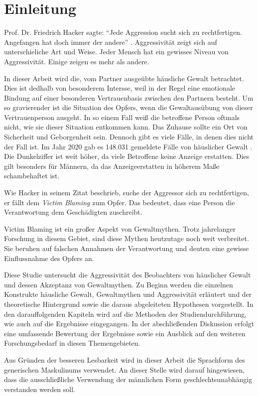 \chapter{Einleitung}   \label{ch_1}
Prof. Dr. Friedrich Hacker sagte: \enquote{Jede Aggression sucht sich zu rechtfertigen. Angefangen hat doch immer der andere} \parencite{Friedrich_Hacker}. Aggressivität zeigt sich auf unterschieliche Art und Weise. Jeder Mensch hat ein gewisses Niveau von Aggressivität. Einige zeigen es mehr als andere. 


In dieser Arbeit wird die, vom Partner ausgeübte häusliche Gewalt betrachtet. Dies ist dedhalb von besonderem Intersse, weil in der Regel eine emotionale Bindung auf einer besonderen Vertrauenbasis zwischen den Partnern besteht. Um so gravierender ist die Situation des Opfers, wenn die Gewaltausübung von dieser Vertrauenperson ausgeht. In so einem Fall weiß die betroffene Person oftmals nicht, wie sie dieser Situation entkommen kann. Das Zuhause sollte ein Ort von Sicherheit und Geborgenheit sein. Dennoch gibt es viele Fälle, in denen dies nicht der Fall ist. Im Jahr 2020 gab es 148.031 gemeldete Fälle von häuslicher Gewalt \parencite{häusliche_Gewalt}. Die Dunkelziffer ist weit höher, da viele Betroffene keine Anzeige erstatten. Dies gilt besonders für Männern, da das Anzeigeerstatten in höherem Maße schambehaftet ist.

Wie Hacker \parencite{Friedrich_Hacker} in seinem Zitat beschrieb, suche der Aggressor sich zu rechtfertigen, er fällt dem \textit{Victim Blaming} zum Opfer. Das bedeutet, dass eine Person die Verantwortung dem Geschädigten zuschreibt. 

Victim Blaming ist ein großer Aspekt von Gewaltmythen. Trotz jahrelanger Forschung in diesem Gebiet, sind diese Mythen heutzutage noch weit verbreitet. 
Sie beruhen auf falschen Annahmen der Verantwortung und deuten eine gewisse Einflussnahme des Opfers an.

Diese Studie untersucht die Aggressivität des Beobachters von häuslicher Gewalt und dessen Akzeptanz von Gewaltmythen. Zu Beginn werden die einzelnen Konstrukte häusliche Gewalt, Gewaltmythen und Aggressivität erläutert und der theoretische Hintergrund sowie die daraus abgeleiteten Hypothesen vorgestellt. In den darauffolgenden Kapiteln wird auf die Methoden der Studiendurchführung, wie auch auf die Ergebnisse eingegangen. In der 
abschließenden Diskussion erfolgt eine umfassende Bewertung der Ergebnisse sowie ein Ausblick auf den weiteren Forschungsbedarf in diesen Themengebieten.

Aus Gründen der besseren Lesbarkeit wird in dieser Arbeit die Sprachform des generischen Maskulinums verwendet. An dieser Stelle wird darauf hingewiesen, dass die ausschließliche Verwendung der männlichen Form geschlechtsunabhängig verstanden werden soll.